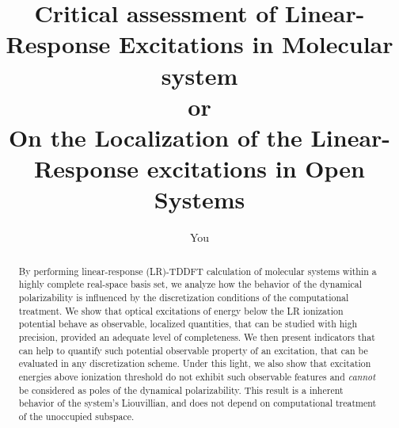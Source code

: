 \documentclass[a4paper]{article}
\title{Critical assessment of Linear-Response Excitations in Molecular system\\
or \\
On the Localization of the Linear-Response excitations in Open Systems}
\author{You}
\begin{document}
\maketitle

\begin{abstract}
By performing linear-response (LR)-TDDFT calculation of molecular systems within a highly complete real-space basis set, we analyze how the behavior of the dynamical 
polarizability is influenced by the discretization conditions of the computational treatment.
We show that optical excitations of energy below the LR ionization potential behave as observable, localized quantities, that can be studied with high precision, 
provided an adequate level of completeness. We then present indicators that can help to quantify such potential observable property of an excitation, that can be evaluated 
in any discretization scheme. Under this light, we also show that excitation energies above ionization threshold do not exhibit such observable features and \emph{cannot} be 
considered as poles of the dynamical polarizability. This result is a inherent behavior of the system's Liouvillian, and does not depend on computational treatment of the 
unoccupied subspace.
\end{abstract}
\end{document}
